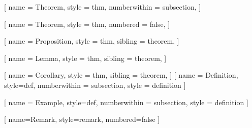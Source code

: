 \usepackage[T1]{fontenc}
\usepackage{amsmath}
\usepackage[fixamsmath]{mathtools}  %
\usepackage{amsthm}
\usepackage{amssymb}
\renewcommand*{\mathbf}[1]{\mathbb{#1}}
\renewcommand{\qedsymbol}{$\blacksquare$}


\usepackage[uprightgreeks,light]{kpfonts}
\usepackage{datetime}


\usepackage{keytheorems}



[
    name = Theorem,
    style = thm,
    numberwithin = subsection,
]

[
    name = Theorem,
    style = thm,
    numbered = false,
]

[
    name = Proposition,
    style = thm,
    sibling = theorem,
]

[
    name = Lemma,
    style = thm,
    sibling = theorem,
]

[
    name = Corollary,
    style = thm,
    sibling = theorem,
]
[
    name = Definition,
    style=def,
    numberwithin = subsection,
    style = definition
]

[
    name = Example,
    style=def,
    numberwithin = subsection,
    style = definition
]

[
    name=Remark,
    style=remark,
    numbered=false
]

